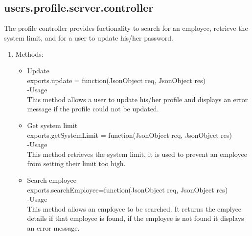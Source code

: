 \documentclass[a4paper,12pt]{article}
\begin{document}
\subsection{users.profile.server.controller}
 The profile controller provides fuctionality to search for an employee, retrieve the system limit, and for a user to update his/her password.
 \begin{enumerate}
 \item Methods:
 	\begin{itemize}
 		\item Update\\
 		exports.update = function(JsonObject req, JsonObject res)\\
 		-Usage\\
 		This method allows a user to update his/her profile and displays an error message if the profile could not be updated. 
 		\item Get system limit\\
 		exports.getSystemLimit = function(JsonObject req, JsonObject res)\\
 		-Usage\\
		 This method retrieves the system limit, it is used to prevent an employee from setting their limit too high.
 		\item Search employee\\
 		exports.searchEmployee=function(JsonObject req, JsonObject res)\\
 		-Usage\\
		 This method allows an employee to be searched. It returns the emplyee details if that employee is found, if the employee is not found it displays an error message.
 	\end{itemize}
 \end{enumerate}
\end{document}
